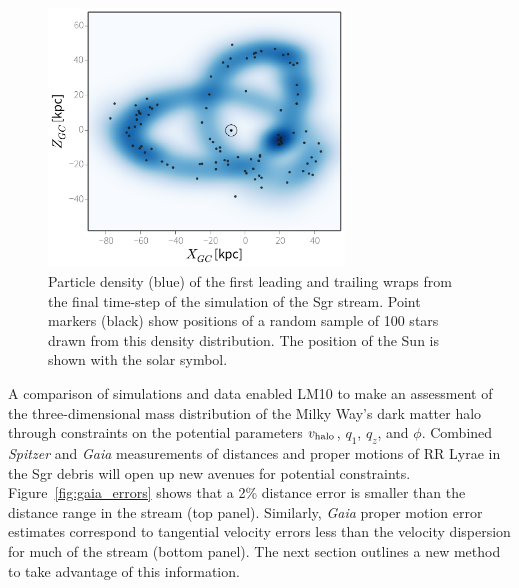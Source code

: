 \begin{figure}[t]
\begin{center}
\includegraphics[width=0.7\textwidth]{figures/ch1/fig2.pdf}
\caption{ Particle density (blue) of the first leading and trailing wraps from the final time-step of the \citet{law10} simulation of the Sgr stream. Point markers (black) show positions of a random sample of 100 stars drawn from this density distribution. The position of the Sun is shown with the solar symbol. }\label{fig:lm10}
\end{center}
\end{figure}

A comparison of simulations and data enabled LM10 to make an assessment of the three-dimensional 
mass distribution of the Milky Way's dark matter
halo through constraints on the potential parameters $v_{\rm halo}$, $q_1$, $q_z$, and $\phi$. Combined {\it Spitzer} and {\it Gaia} measurements of distances and proper motions
of RR Lyrae in the Sgr debris will open up new avenues for potential constraints. Figure~\ref{fig:gaia_errors} shows that a 2\% distance error is smaller than the 
distance range in the stream (top panel). Similarly, {\it Gaia} proper motion
error estimates correspond to tangential velocity errors less than the velocity
dispersion for much of the stream (bottom panel). The next section outlines a 
new method to take advantage of this information. 


